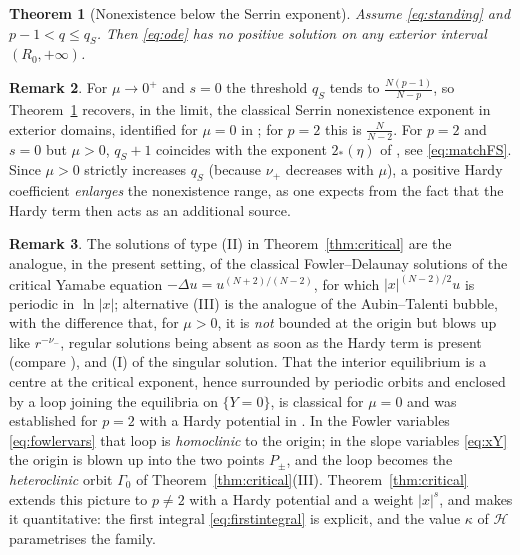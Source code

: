 \documentclass[11pt,reqno]{amsart}
\numberwithin{equation}{section}
\theoremstyle{plain}
\newtheorem{theorem}{Theorem}[section]
\theoremstyle{definition}
\newtheorem{remark}[theorem]{Remark}
\begin{document}
\begin{theorem}[Nonexistence below the Serrin exponent]\label{thm:nonex}
Assume \eqref{eq:standing} and $p-1<q\le q_{S}$. Then \eqref{eq:ode} has
\emph{no} positive solution on any exterior interval $(R_{0},+\infty)$.
\end{theorem}

\begin{remark}
For $\mu\to0^{+}$ and $s=0$ the threshold $q_{S}$ tends to
$\frac{N(p-1)}{N-p}$, so Theorem~\ref{thm:nonex} recovers, in the limit, the
classical Serrin nonexistence exponent in exterior domains, identified for
$\mu=0$ in \cite{GueddaVeron}; for $p=2$ this is $\frac{N}{N-2}$. For $p=2$ and
$s=0$ but $\mu>0$, $q_{S}+1$ coincides with the exponent $2_{*}(\eta)$ of
\cite{FrancaSfecci}, see \eqref{eq:matchFS}. Since $\mu>0$ strictly increases
$q_{S}$ (because $\nu_{+}$ decreases with $\mu$), a positive Hardy coefficient
\emph{enlarges} the nonexistence range, as one expects from the fact that the
Hardy term then acts as an additional source.
\end{remark}

\begin{remark}\label{rem:delaunay}
The solutions of type {\rm(II)} in Theorem~\ref{thm:critical} are the analogue,
in the present setting, of the classical Fowler--Delaunay solutions of the
critical Yamabe equation $-\Delta u=u^{(N+2)/(N-2)}$, for which
$|x|^{(N-2)/2}u$ is periodic in $\ln|x|$; alternative {\rm(III)} is the analogue
of the Aubin--Talenti bubble, with the difference that, for $\mu>0$, it is
\emph{not} bounded at the origin but blows up like $r^{-\nu_{-}}$, regular
solutions being absent as soon as the Hardy term is present (compare
\cite[Rem.~2.7]{FrancaSfecci}), and {\rm(I)} of the singular solution. That the
interior equilibrium is a centre at the critical exponent, hence surrounded by
periodic orbits and enclosed by a loop joining the equilibria on $\{Y=0\}$, is
classical for $\mu=0$ \cite{Franca2004,Franca2009,JPY,BianchiEgnell} and was
established for $p=2$ with a Hardy potential in \cite[\S2.1]{FrancaSfecci}. In
the Fowler variables \eqref{eq:fowlervars} that loop is \emph{homoclinic} to
the origin; in the slope variables \eqref{eq:xY} the origin is blown up into
the two points $P_{\pm}$, and the loop becomes the \emph{heteroclinic} orbit
$\Gamma_{0}$ of Theorem~\ref{thm:critical}{\rm(III)}. Theorem~\ref{thm:critical}
extends this picture to $p\ne2$ with a Hardy potential and a weight $|x|^{s}$,
and makes it quantitative: the first integral \eqref{eq:firstintegral} is
explicit, and the value $\kappa$ of $\mathcal H$ parametrises the family.
\end{remark}
\end{document}
